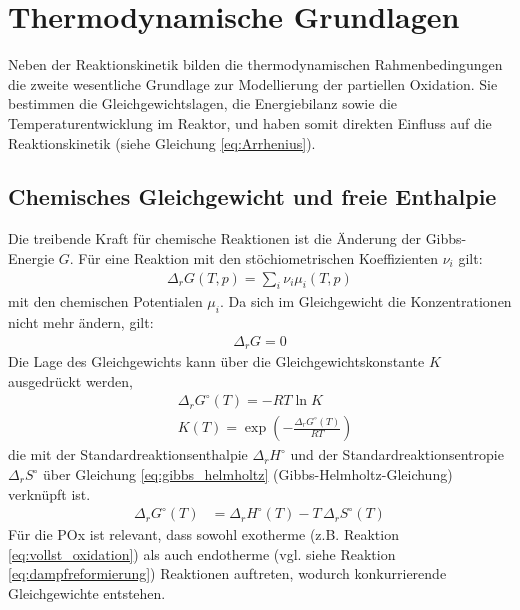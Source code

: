     \section{Thermodynamische Grundlagen}
        Neben der Reaktionskinetik bilden die thermodynamischen Rahmenbedingungen die zweite wesentliche Grundlage zur Modellierung der partiellen Oxidation. Sie bestimmen die Gleichgewichtslagen, die Energiebilanz sowie die Temperaturentwicklung im Reaktor, und haben somit direkten Einfluss auf die  Reaktionskinetik (siehe Gleichung \ref{eq:Arrhenius}).
        \subsection{Chemisches Gleichgewicht und freie Enthalpie}
            Die treibende Kraft für chemische Reaktionen ist die Änderung der Gibbs-Energie $G$. Für eine Reaktion mit den stöchiometrischen Koeffizienten $\nu_i$ gilt:
            \begin{align}
                \Delta_rG(T,p) = \sum_i\nu_i\mu_i(T,p)
            \end{align}
            mit den chemischen Potentialen $\mu_i$. Da sich im Gleichgewicht die Konzentrationen nicht mehr ändern, gilt:
            \begin{align}
                \Delta_rG=0
            \end{align}
            Die Lage des Gleichgewichts kann über die Gleichgewichtskonstante $K$ ausgedrückt werden, 
            \begin{align}
                &\Delta_rG^\circ(T) = -RT \ln K  \\
                & K(T) = \exp \left( - \frac{\Delta_rG^\circ(T)}{RT}\right)
            \end{align}
            die mit der Standardreaktionsenthalpie $\Delta_rH^\circ$ und der Standardreaktionsentropie $\Delta_rS^\circ$ über Gleichung \ref{eq:gibbs_helmholtz} (Gibbs-Helmholtz-Gleichung) verknüpft ist.
            \begin{align}
                \Delta_r G^\circ(T) &= \Delta_r H^\circ(T) - T \, \Delta_r S^\circ(T) \label{eq:gibbs_helmholtz}
            \end{align}
            Für die POx ist relevant, dass sowohl exotherme (z.B. Reaktion  \ref{eq:vollst_oxidation}) als auch endotherme (vgl. siehe Reaktion \ref{eq:dampfreformierung}) Reaktionen auftreten, wodurch konkurrierende Gleichgewichte entstehen. 
